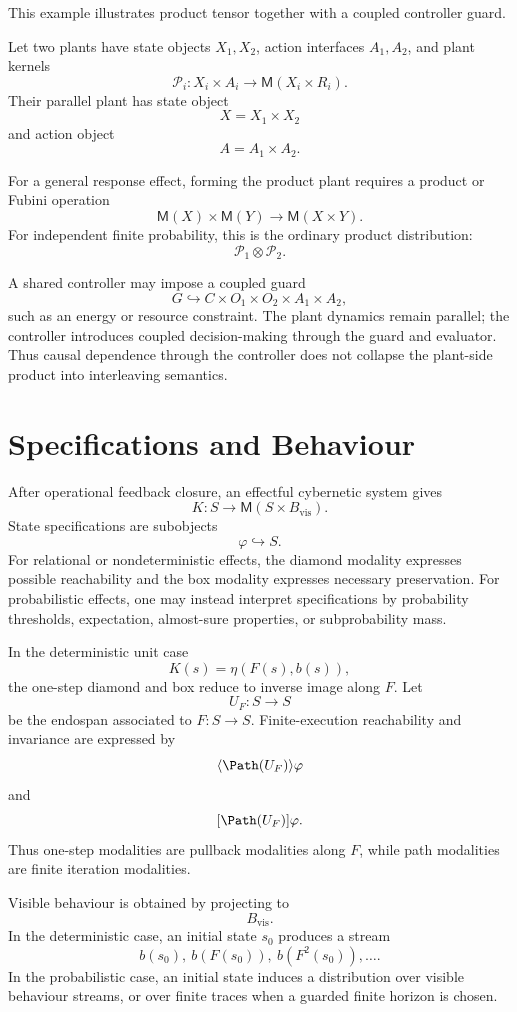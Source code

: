 This example illustrates product tensor together with a coupled controller guard.

Let two plants have state objects \(X_1,X_2\), action interfaces \(A_1,A_2\), and plant kernels
\[
\mathcal P_i:X_i\times A_i\to \mathsf M(X_i\times R_i).
\]
Their parallel plant has state object
\[
X=X_1\times X_2
\]
and action object
\[
A=A_1\times A_2.
\]

For a general response effect, forming the product plant requires a product or Fubini operation
\[
\mathsf M(X)\times\mathsf M(Y)\to\mathsf M(X\times Y).
\]
For independent finite probability, this is the ordinary product distribution:
\[
\mathcal P_1\otimes \mathcal P_2.
\]

A shared controller may impose a coupled guard
\[
G\hookrightarrow C\times O_1\times O_2\times A_1\times A_2,
\]
such as an energy or resource constraint.  The plant dynamics remain parallel; the controller
introduces coupled decision-making through the guard and evaluator.  Thus causal dependence through
the controller does not collapse the plant-side product into interleaving semantics.

\section{Specifications and Behaviour}
\label{sec:effectful-cybernetic-specifications}

After operational feedback closure, an effectful cybernetic system gives
\[
K:S\to \mathsf M(S\times B_{\mathrm{vis}}).
\]
State specifications are subobjects
\[
\varphi\hookrightarrow S.
\]
For relational or nondeterministic effects, the diamond modality expresses possible reachability
and the box modality expresses necessary preservation.  For probabilistic effects, one may instead
interpret specifications by probability thresholds, expectation, almost-sure properties, or
subprobability mass.

In the deterministic unit case
\[
K(s)=\eta(F(s),b(s)),
\]
the one-step diamond and box reduce to inverse image along \(F\).  Let
\[
U_F:S\to S
\]
be the endospan associated to \(F:S\to S\).  Finite-execution reachability and invariance are
expressed by
\[
\langle \Path(U_F)\rangle\varphi
\]
and
\[
[\Path(U_F)]\varphi.
\]
Thus one-step modalities are pullback modalities along \(F\), while path modalities are finite
iteration modalities.

Visible behaviour is obtained by projecting to
\[
B_{\mathrm{vis}}.
\]
In the deterministic case, an initial state \(s_0\) produces a stream
\[
b(s_0),\ b(F(s_0)),\ b(F^2(s_0)),\ldots .
\]
In the probabilistic case, an initial state induces a distribution over visible behaviour streams,
or over finite traces when a guarded finite horizon is chosen.

